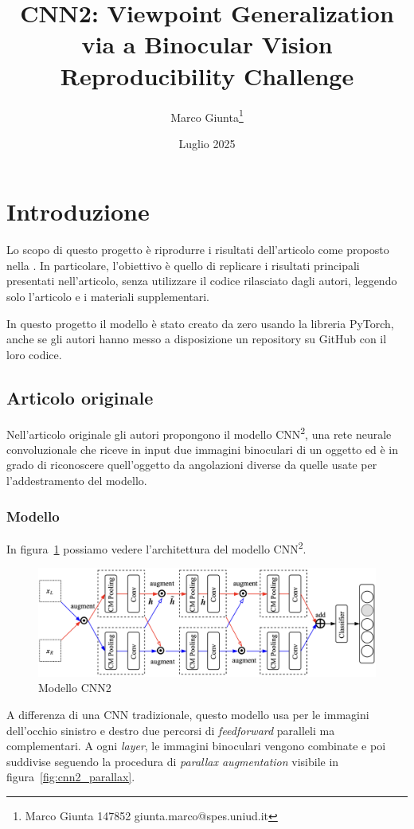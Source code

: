 \documentclass[italian,12pt,a4paper,oneside,final]{report}
\title{\Large CNN2: Viewpoint Generalization via a Binocular Vision\\[0.5em]
\large Reproducibility Challenge}
\date{Luglio 2025}
\author{
Marco Giunta\thanks{Marco Giunta 147852 giunta.marco@spes.uniud.it}}
\begin{document}
\maketitle

\tableofcontents

\newpage
\section{Introduzione}

Lo scopo di questo progetto è riprodurre i risultati dell'articolo \cite{neurips2019:cnn2} come proposto nella \cite{neurips2019:reproducibility-challenge}.
In particolare, l'obiettivo è quello di replicare i risultati principali presentati nell'articolo, senza utilizzare il codice rilasciato dagli autori, leggendo solo l'articolo e i materiali supplementari.

In questo progetto il modello è stato creato da zero usando la libreria PyTorch, anche se gli autori hanno messo a disposizione un repository\cite{cnn2:repository} su GitHub con il loro codice.

\subsection{Articolo originale}
Nell'articolo originale gli autori propongono il modello CNN\textsuperscript{2}, una rete neurale convoluzionale che riceve in input due immagini binoculari di un oggetto ed è in grado di riconoscere quell'oggetto da angolazioni diverse da quelle usate per l'addestramento del modello.

\subsubsection{Modello}
In figura~\ref{fig:cnn2_model} possiamo vedere l'architettura del modello CNN\textsuperscript{2}.
\begin{figure}[ht]
	\centering
	\includegraphics[width=1\textwidth]{model-cnn2.png}
	\caption{Modello CNN2}
	\label{fig:cnn2_model}
\end{figure}
A differenza di una CNN tradizionale, questo modello usa per le immagini dell'occhio sinistro e destro due percorsi di \textit{feedforward} paralleli ma complementari.
A ogni \textit{layer}, le immagini binoculari vengono combinate e poi suddivise seguendo la procedura di \textit{parallax augmentation} visibile in figura~\ref{fig:cnn2_parallax}.
\end{document}
